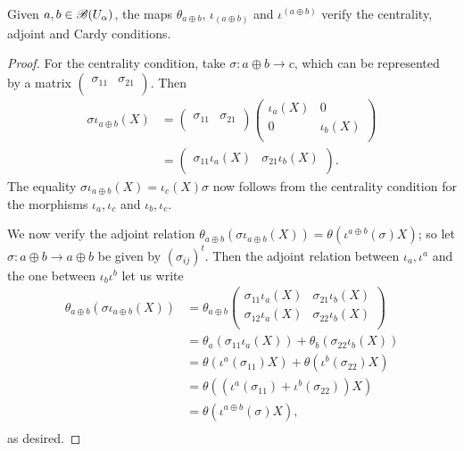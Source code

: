 \begin{theorem}\label{maximal_additive}
Given $a,b \in \mathscr{B}(U_\alpha )$, the maps $\theta_{a\oplus b}$, $\iota_{(a\oplus b)}$ and $\iota^{(a\oplus b)}$ verify the centrality, adjoint and Cardy conditions.
\end{theorem}

\begin{proof}
For the centrality condition, take $\sigma :a\oplus b\to c$, which can be represented by a matrix $\left (\begin{smallmatrix} \sigma_{11} & \sigma_{21} \\ \end{smallmatrix}\right )$. Then
$$
\begin{aligned}
\sigma \iota_{a\oplus b}(X) &= \left (\begin{smallmatrix} \sigma_{11} & \sigma_{21} \\ \end{smallmatrix}\right ) \left (\begin{smallmatrix} \iota_a(X) & 0 \\ 0 & \iota_b(X) \\ \end{smallmatrix}\right )\\
									          &= \left (\begin{smallmatrix} \sigma_{11}\iota_a(X) & \sigma_{21}\iota_b(X) \\ \end{smallmatrix}\right ).
\end{aligned}
$$
The equality $\sigma \iota_{a\oplus b}(X)=\iota_c(X)\sigma$ now follows from the centrality condition for the morphisms $\iota_a,\iota_c$ and $\iota_b,\iota_c$.

We now verify the adjoint relation $\theta_{a\oplus b}\left (\sigma \iota_{a\oplus b}(X)\right )=\theta \left (\iota^{a\oplus b}(\sigma )X\right )$; so let $\sigma :a\oplus b\to a\oplus b$ be given by $(\sigma_{ij})^t$. Then the adjoint relation between $\iota_a,\iota^a$ and the one between $\iota_b\iota^b$ let us write
$$
\begin{aligned}
\theta_{a\oplus b}\left (\sigma \iota_{a\oplus b}(X)\right ) &= \theta_{a\oplus b}\left (\begin{smallmatrix} \sigma_{11}\iota_a(X) & \sigma_{21}\iota_b(X) \\ \sigma_{12}\iota_a(X) & \sigma_{22}\iota_b(X) \\ \end{smallmatrix} \right ) \\
																											       &= \theta_a\left (\sigma_{11}\iota_a(X)\right )+\theta_b\left (\sigma_{22}\iota_b(X)\right ) \\
																														 &= \theta \left (\iota^a(\sigma_{11})X\right )+\theta \left (\iota^b(\sigma_{22})X\right ) \\
																														 &= \theta \left (\left (\iota^a(\sigma_{11})+\iota^b(\sigma_{22})\right )X\right ) \\
																														 &= \theta \left (\iota^{a\oplus b}(\sigma )X\right ), \\
\end{aligned}
$$
as desired.


\end{proof}
